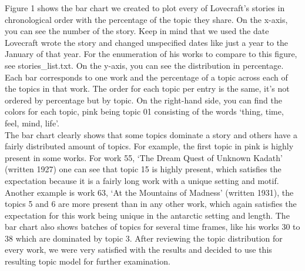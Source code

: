 Figure 1 shows the bar chart we created to plot every of Lovecraft’s stories in chronological order 
with the percentage of the topic they share. On the x-axis, you can see the number of the story. 
Keep in mind that we used the date Lovecraft wrote the story and changed unspecified dates like just 
a year to the January of that year. For the enumeration of his works to compare to this figure, see 
stories\_list.txt. On the y-axis, you can see the distribution in percentage. Each bar corresponds to 
one work and the percentage of a topic across each of the topics in that work. The order for each 
topic per entry is the same, it’s not ordered by percentage but by topic. On the right-hand side, you 
can find the colors for each topic, pink being topic 01 consisting of the words ‘thing, time, feel, 
mind, life’.\\

The bar chart clearly shows that some topics dominate a story and others have a fairly distributed 
amount of topics. For example, the first topic in pink is highly present in some works. For 
work 55, ‘The Dream Quest of Unknown Kadath’ (written 1927) one can see that topic 15 is highly 
present, which satisfies the expectation because it is a fairly long work with a unique setting 
and motif. Another example is work 63, ‘At the Mountains of Madness’ (written 1931), the topics 
5 and 6 are more present than in any other work, which again satisfies the expectation for this 
work being unique in the antarctic setting and length. The bar chart also shows batches of topics 
for several time frames, like his works 30 to 38 which are dominated by topic 3. After reviewing 
the topic distribution for every work, we were very satisfied with the results and decided to use 
this resulting topic model for further examination.\\

